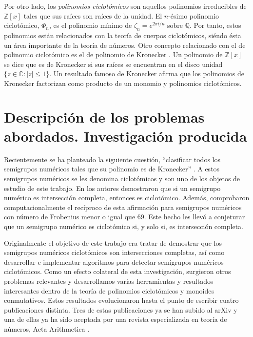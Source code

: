 Por otro lado, los \emph{polinomios ciclotómicos} son aquellos polinomios irreducibles de $\mathbb{Z}[x]$
tales que sus raíces son raíces de la unidad. El $n$-ésimo polinomio ciclotómico, $\Phi_n$, es el polinomio mínimo de $\zeta_n = e^{2 \pi i / n}$ sobre $\mathbb{Q}$. Por tanto, estos polinomios están relacionados con la teoría de cuerpos ciclotómicos, siéndo ésta un área importante de la teoría de números. Otro concepto relacionado con el de polinomio ciclotómico es el de polinomio de Kronecker \cite{kronecker}. Un polinomio de $\mathbb{Z}[x]$ se dice que es de Kronecker si sus raíces se encuentran en el disco unidad $\{z \in \mathbb{C} : |z|\le 1\}$. Un resultado famoso de Kronecker afirma que los polinomios de Kronecker factorizan como  producto de un monomio y polinomios ciclotómicos.

\section*{Descripción de los problemas abordados. Investigación producida}

Recientemente se ha planteado la siguiente cuestión, ``clasificar todos los semigrupos numéricos tales que su polinomio es de Kronecker'' \cite{cyclotomic}. A estos semigrupos numéricos se les denomina ciclotómicos y son uno de los objetos de estudio de este trabajo. En \cite{cyclotomic} los autores demostraron que si un semigrupo numérico es intersección completa, entonces es ciclotómico. Además, comprobaron computacionalmente el recíproco de esta afirmación para semigrupos numéricos con número de Frobenius menor o igual que 69. Este hecho les llevó a conjeturar que un semigrupo numérico es ciclotómico si, y solo si, es intersección completa.

Originalmente el objetivo de este trabajo era tratar de demostrar que los semigrupos numéricos ciclotómicos son intersecciones completas, así como desarrollar e implementar algoritmos para detectar semigrupos numéricos ciclotómicos. Como un efecto colateral de esta investigación, surgieron otros problemas relevantes y desarrollamos varias herramientas y resultados interesantes dentro de la teoría de polinomios ciclotómicos y monoides conmutativos. Estos resultados evolucionaron hasta el punto de escribir cuatro publicaciones distinta. Tres de estas publicaciones ya se han subido al arXiv \cite{cyclo:roots-unity:extended, cyclo:log-deriv, isolated} y una de ellas ya ha sido aceptada por una revista especializada en teoría de números, Acta Arithmetica \cite{cyclo:roots-unity}.

